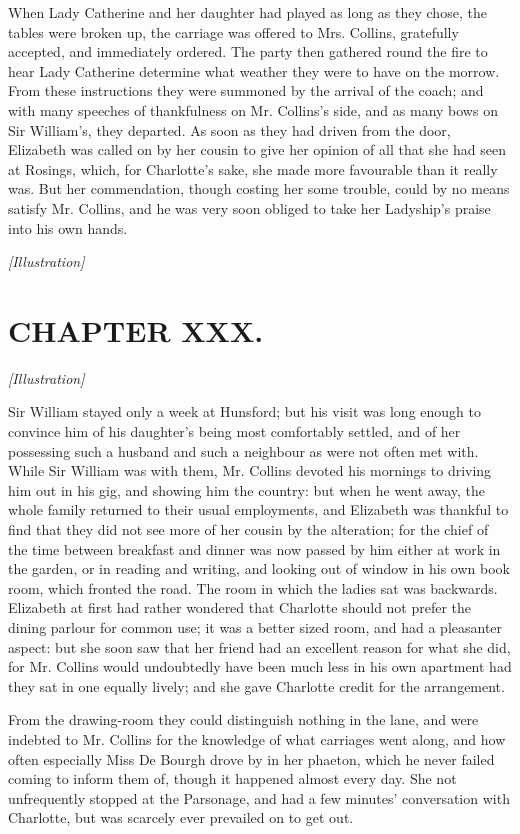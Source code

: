 \documentclass[12pt]{book}
\begin{document}
When Lady Catherine and her daughter had played as long as they chose, the tables were broken up, the carriage was offered to Mrs. Collins, gratefully accepted, and immediately ordered. The party then gathered round the fire to hear Lady Catherine determine what weather they were to have on the morrow. From these instructions they were summoned by the arrival of the coach; and with many speeches of thankfulness on Mr. Collins's side, and as many bows on Sir William's, they departed. As soon as they had driven from the door, Elizabeth was called on by her cousin to give her opinion of all that she had seen at Rosings, which, for Charlotte's sake, she made more favourable than it really was. But her commendation, though costing her some trouble, could by no means satisfy Mr. Collins, and he was very soon obliged to take her Ladyship's praise into his own hands.

\emph{[Illustration]}

\chapter{CHAPTER XXX.}

\emph{[Illustration]}

Sir William stayed only a week at Hunsford; but his visit was long enough to convince him of his daughter's being most comfortably settled, and of her possessing such a husband and such a neighbour as were not often met with. While Sir William was with them, Mr. Collins devoted his mornings to driving him out in his gig, and showing him the country: but when he went away, the whole family returned to their usual employments, and Elizabeth was thankful to find that they did not see more of her cousin by the alteration; for the chief of the time between breakfast and dinner was now passed by him either at work in the garden, or in reading and writing, and looking out of window in his own book room, which fronted the road. The room in which the ladies sat was backwards. Elizabeth at first had rather wondered that Charlotte should not prefer the dining parlour for common use; it was a better sized room, and had a pleasanter aspect: but she soon saw that her friend had an excellent reason for what she did, for Mr. Collins would undoubtedly have been much less in his own apartment had they sat in one equally lively; and she gave Charlotte credit for the arrangement.

From the drawing-room they could distinguish nothing in the lane, and were indebted to Mr. Collins for the knowledge of what carriages went along, and how often especially Miss De Bourgh drove by in her phaeton, which he never failed coming to inform them of, though it happened almost every day. She not unfrequently stopped at the Parsonage, and had a few minutes' conversation with Charlotte, but was scarcely ever prevailed on to get out.
\end{document}
